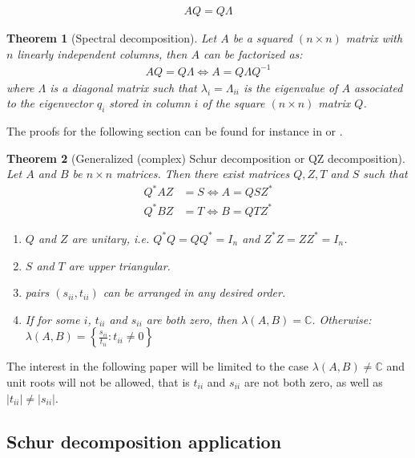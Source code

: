 \documentclass{pracamgr}
\numberwithin{equation}{section}
\newtheorem{theorem}{Theorem}
\begin{document}
\begin{align}
AQ = Q\Lambda
\end{align}

\begin{theorem}[Spectral decomposition]
Let $A$ be a squared $(n\times n)$ matrix with $n$ linearly independent columns, then $A$ can be factorized as:
  \begin{align*}
  AQ = Q \Lambda \Leftrightarrow A = Q \Lambda Q^{-1}
  \end{align*} 
where $\Lambda$ is a diagonal matrix such that $\lambda_i =\Lambda_{ii}$ is the eigenvalue of $A$ associated to the eigenvector $q_i$ stored in column $i$ of the square $(n \times n)$ matrix $Q$.
\end{theorem}

The proofs for the following section can be found for instance in \cite{roman2008graduate} or \cite{brown1988second}.  

\begin{theorem}[Generalized (complex) Schur decomposition or QZ decomposition]
Let $A$ and $B$ be $n\times n$ matrices. Then there exist matrices $Q,Z,T$ and $S$ such that
\begin{align*}
  Q^* A Z &= S \Leftrightarrow A = Q S Z^*\\
  Q^* B Z &= T \Leftrightarrow B = Q T Z^*
\end{align*}
\begin{enumerate}
  \item $Q$ and $Z$ are unitary, i.e. $Q^*Q=QQ^*=I_n$ and $Z^*Z=ZZ^*=I_n$.
  \item $S$ and $T$ are upper triangular.
 \item pairs $(s_{ii},t_{ii})$ can be arranged in any desired order.
  \item If for some $i$, $t_{ii}$ and $s_{ii}$ are both zero, then $\lambda(A,B)=\mathbb{C}$. Otherwise:
$\lambda(A,B) = \left\{\frac{s_{ii}}{t_{ii}}:t_{ii} \neq 0 \right\}$
\end{enumerate}
\end{theorem}

The interest in the following paper will be limited to the case $\lambda(A,B)\neq \mathbb{C}$ and unit roots will not be allowed, that is $t_{ii}$ and $s_{ii}$ are not both zero, as well as $|t_{ii}|\neq |s_{ii}|$.

\subsection{Schur decomposition application}
\end{document}
